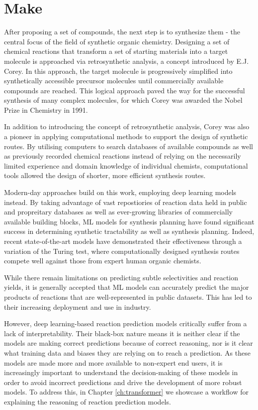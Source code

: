 \section*{Make}
After proposing a set of compounds, the next step is to synthesize them - the central focus of the field of synthetic organic chemistry. Designing a set of chemical reactions that transform a set of starting materials into a target molecule is approached via retrosynthetic analysis, a concept introduced by E.J. Corey. In this approach, the target molecule is progressively simplified into synthetically accessible precursor molecules until commercially available compounds are reached. This logical approach paved the way for the successful synthesis of many complex molecules, for which Corey was awarded the Nobel Prize in Chemistry in 1991.

In addition to introducing the concept of retrosynthetic analysis, Corey was also a pioneer in applying computational methods to support the design of synthetic routes. By utilising computers to search databases of available compounds as well as previously recorded chemical reactions instead of relying on the necessarily limited experience and domain knowledge of individual chemists, computational tools allowed the design of shorter, more efficient synthesis routes.

Modern-day approaches build on this work, employing deep learning models instead. By taking advantage of vast repostiories of reaction data held in public and propreitary databases as well as ever-growing libraries of commercially available building blocks, ML models for synthesis planning have found significant success in determining synthetic tractability as well as synthesis planning. Indeed, recent state-of-the-art models have demonstrated their effectiveness through a variation of the Turing test, where computationally designed synthesis routes compete well against those from expert human organic chemists.

While there remain limitations on predicting subtle selectivities and reaction yields, it is generally accepted that ML models can accurately predict the major products of reactions that are well-represented in public datasets. This has led to their increasing deployment and use in industry.

However, deep learning-based reaction prediction models critically suffer from a lack of interpretability. Their black-box nature means it is neither clear if the models are making correct predictions because of correct reasoning, nor is it clear what training data and biases they are relying on to reach a prediction. As these models are made more and more available to non-expert end users, it is increasingly important to understand the decision-making of these models in order to avoid incorrect predictions and drive the development of more robust models. To address this, in Chapter \ref{ch:transformer} we showcase a workflow for explaining the reasoning of reaction prediction models.

